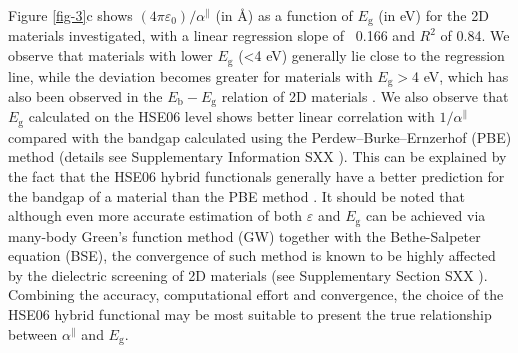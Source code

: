 \documentclass[journal=ancac3,manuscript=article,email=true,hyperref=true,keywords=false]{achemso}
\begin{document}
Figure \ref{fig-3}c
shows $(4 \pi \varepsilon_{0})/\alpha^{\parallel}$ (in \AA{}) as a
function of $E_{\mathrm{g}}$ (in eV) for the 2D materials
investigated, with a linear regression slope of ~0.166 and $R^{2}$ of
0.84. We observe that materials with lower $E_{\mathrm{g}}$ (<4 eV)
generally lie close to the regression line, while the deviation
becomes greater for materials with $E_{\mathrm{g}}>$4 eV, which has
also been observed in the $E_{\mathrm{b}}-E_{\mathrm{g}}$ relation of
2D materials \cite{Olsen_2016_hydrogen,Jiang_2017_Eg_Eb}. We also
observe that $E_{\mathrm{g}}$ calculated on the HSE06 level shows
better linear correlation with $1/\alpha^{\parallel}$ compared with
the bandgap calculated using the Perdew–Burke–Ernzerhof (PBE) method
(details see Supplementary Information SXX ). This can be
explained by the fact that the HSE06 hybrid functionals generally have
a better prediction for the bandgap of a material than the PBE method
. It should be noted that although even more
accurate estimation of both $\varepsilon$ and $E_{\mathrm{g}}$ can be
achieved via many-body Green’s function method (GW) together with the
Bethe-Salpeter equation (BSE), the convergence of such method is known
to be highly affected by the dielectric screening of 2D materials
\cite{Hueser_2013_2Dvs3D} (see Supplementary Section SXX
\todo{}). Combining the accuracy, computational effort and
convergence, the choice of the HSE06 hybrid functional may be most
suitable to present the true relationship between $\alpha^{\parallel}$
and $E_{\mathrm{g}}$.
\end{document}
